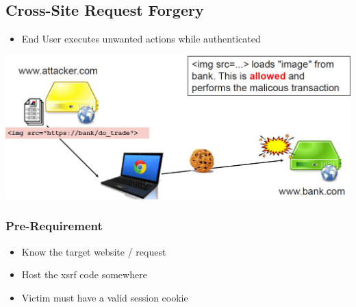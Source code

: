 \subsection{Cross-Site Request Forgery}
\begin{itemize}
    \item End User executes unwanted actions while authenticated
\end{itemize}
\includegraphics[width=\linewidth]{../img/xsrf.png}

\subsubsection{Pre-Requirement}
\begin{itemize}
    \item Know the target website / request
    \item Host the xsrf code somewhere
    \item Victim must have a valid session cookie
\end{itemize}

